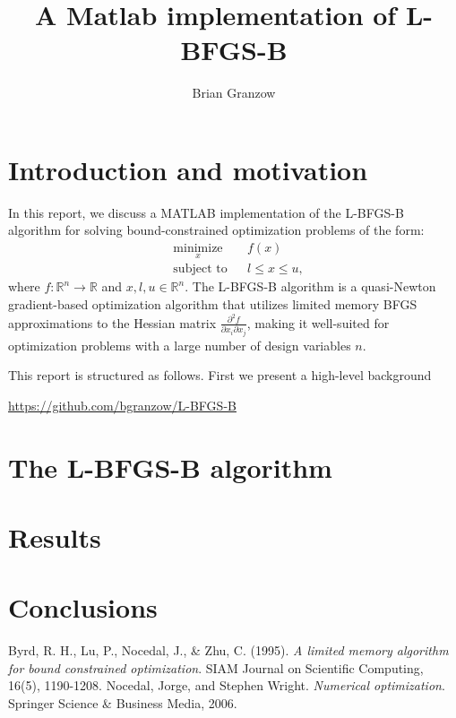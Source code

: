 \documentclass[11pt]{article}
\title{A Matlab implementation of L-BFGS-B}
\author{Brian Granzow}
\date{}
\begin{document}
\maketitle

\section{Introduction and motivation}
In this report, we discuss a MATLAB implementation of
the L-BFGS-B \cite{lbfgsb} algorithm for solving
bound-constrained optimization problems of the form:
%
\begin{equation}
\begin{aligned}
& \underset{x}{\text{minimize}}
& & f(x) \\
& \text{subject to}
& & l \leq x \leq u,
\end{aligned}
\end{equation}
%
where $f: \mathbb{R}^n \to \mathbb{R}$ and $x,l,u \in \mathbb{R}^n$.
The L-BFGS-B algorithm is a quasi-Newton gradient-based
optimization algorithm that utilizes limited memory
BFGS approximations to the Hessian matrix
$\frac{\partial^2 f}{\partial x_i \partial x_j}$, making
it well-suited for optimization problems with a large
number of design variables $n$.

This report is structured as follows. First we present
a high-level background 

\url{https://github.com/bgranzow/L-BFGS-B}

\section{The L-BFGS-B algorithm}

\section{Results}

\section{Conclusions}

\begin{thebibliography}{99}
Byrd, R. H., Lu, P., Nocedal, J., \& Zhu, C. (1995).
\emph{A limited memory algorithm for bound constrained optimization}.
SIAM Journal on Scientific Computing, 16(5), 1190-1208.
Nocedal, Jorge, and Stephen Wright.
\emph{Numerical optimization}. Springer Science \& Business Media, 2006.
\end{thebibliography}

\newpage
\end{document}
